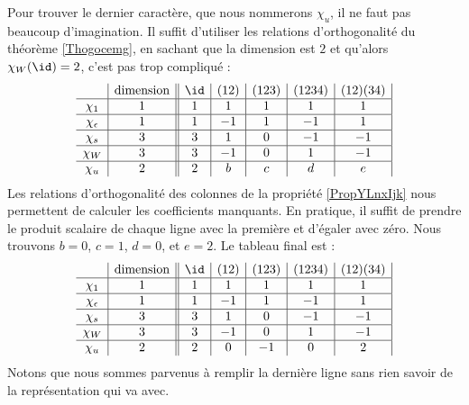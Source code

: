 Pour trouver le dernier caractère, que nous nommerons \( \chi_u\), il ne faut pas beaucoup d'imagination. Il suffit d'utiliser les relations d'orthogonalité du théorème \ref{Thogocemg}, en sachant que la dimension est \( 2\) et qu'alors \( \chi_W(\id)=2\), c'est pas trop compliqué :
\begin{equation}    \label{EqOKtZYFQ}
    \begin{array}[]{c|c||c|c|c|c|c|}
        &\text{dimension}&\id&(12)&(123)&(1234)&(12)(34)\\
          \hline
          \chi_1&1&1&1&1&1&1\\ 
          \hline
          \chi_{\epsilon}&1&1&-1&1&-1&1\\ 
          \hline
          \chi_s&3&3&1&0&-1&-1\\ 
          \hline
          \chi_W&3&3&-1&0&1&-1\\ 
          \hline
          \chi_u&2&2&b&c&d&e\\ 
    \end{array}
\end{equation}
Les relations d'orthogonalité des colonnes de la propriété \ref{PropYLnxIjk} nous permettent de calculer les coefficients manquants. En pratique, il suffit de prendre le produit scalaire de chaque ligne avec la première et d'égaler avec zéro. Nous trouvons \( b=0\), \( c=1\), \( d=0\), et \( e=2\). Le tableau final est :
\begin{equation}    \label{EqOKtZYFQ}
    \begin{array}[]{c|c||c|c|c|c|c|}
        &\text{dimension}&\id&(12)&(123)&(1234)&(12)(34)\\
          \hline
          \chi_1&1&1&1&1&1&1\\ 
          \hline
          \chi_{\epsilon}&1&1&-1&1&-1&1\\ 
          \hline
          \chi_s&3&3&1&0&-1&-1\\ 
          \hline
          \chi_W&3&3&-1&0&1&-1\\ 
          \hline
          \chi_u&2&2&0&-1&0&2\\ 
    \end{array}
\end{equation}
Notons que nous sommes parvenus à remplir la dernière ligne sans rien savoir de la représentation qui va avec.

